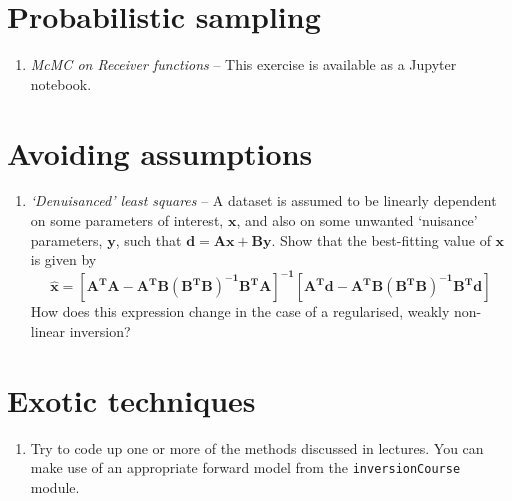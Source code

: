 \documentclass[a4paper,11pt]{article}
\begin{document}
 
\section{Probabilistic sampling}
\begin{enumerate}[resume]
\item \textit{McMC on Receiver functions} -- This exercise is available as a Jupyter notebook.
\end{enumerate}

 
\section{Avoiding assumptions}
\begin{enumerate}[resume]
\item \textit{`Denuisanced' least squares} -- A dataset is assumed to be linearly dependent on some parameters of interest, $\mathbf{x}$, and also on some unwanted `nuisance' parameters, $\mathbf{y}$, such that $\mathbf{d}=\mathbf{Ax}+\mathbf{By}$. Show that the best-fitting value of $\mathbf{x}$ is given by
\[\mathbf{\hat{x}} = \left[\mathbf{A^TA - A^TB\left(B^TB\right)^{-1}B^TA}\right]^\mathbf{-1}\left[\mathbf{A^Td - A^TB\left(B^TB\right)^{-1}B^Td}\right]\]
How does this expression change in the case of a regularised, weakly non-linear inversion?
\end{enumerate}

 
\section{Exotic techniques}
\begin{enumerate}[resume]
\item Try to code up one or more of the methods discussed in lectures. You can make use of an appropriate forward model from  the \texttt{inversionCourse} module.
\end{enumerate}
\end{document}
